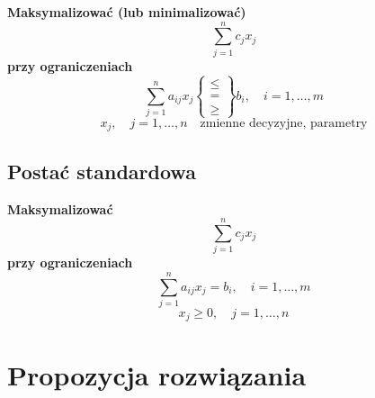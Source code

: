     \noindent
    \textbf{Maksymalizować (lub minimalizować)}
    \[
    \sum_{j=1}^{n} c_j x_j
    \]
    \textbf{przy ograniczeniach}
    \[
    \sum_{j=1}^{n} a_{ij} x_j \left\{
    \begin{array}{l}
    \leq \\
    = \\
    \geq
    \end{array} \right\} b_i, \quad i = 1, \dots, m
    \]
    \[
    x_j, \quad j = 1, \dots, n \quad \text{zmienne decyzyjne, parametry}
    \]

\newpage

\subsection{Postać standardowa}

    \noindent
    \textbf{Maksymalizować}
    \[
    \sum_{j=1}^{n} c_j x_j \tag{9}
    \]
    \textbf{przy ograniczeniach}
    \[
    \sum_{j=1}^{n} a_{ij} x_j = b_i, \quad i = 1, \dots, m \tag{10}
    \]
    \[
    x_j \geq 0, \quad j = 1, \dots, n \tag{11}
    \]



\section{Propozycja rozwiązania}




